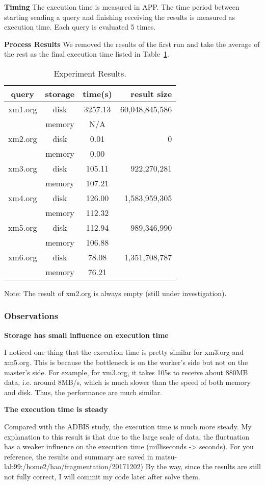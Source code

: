 \textbf{Timing} The execution time is measured in APP. The time period between
starting sending a query and finishing receiving the results is measured as
execution time. Each query is evaluated 5 times. 

\textbf{Process Results}
We removed the results of the  first run and take the average of the rest as
the final execution time listed in Table~\ref{table:E2017120401_1}. 


\begin{table}[t]
	\caption{Experiment Results.}
	\label{table:E2017120401_1}
	\centering
	\begin{tabular}{c|c|c|r}
 		\hline \hline
 query  & storage & time(s)  &   result size  \\
 \hline \hline
 xm1.org &  disk   & 3257.13  & 60,048,845,586 \\
         & memory  &    N/A   &  \\
 \hline
 xm2.org &  disk   &    0.01  &              0 \\
         & memory  &    0.00  &  \\
  \hline
 xm3.org &  disk   &  105.11  &    922,270,281 \\
         & memory  &  107.21  &  \\
  \hline
 xm4.org &  disk   &  126.00  &  1,583,959,305 \\
         & memory  &  112.32  &  \\
  \hline
 xm5.org &  disk   &  112.94  &    989,346,990 \\
         & memory  &  106.88  &   \\
  \hline
 xm6.org &  disk   &   78.08  &  1,351,708,787 \\
         & memory  &   76.21  &   \\
 \hline \hline
	\end{tabular}
\end{table}


Note: The result of xm2.org is always empty (still under investigation).


\subsubsection{Observations}
\textbf{Storage has small influence on execution time}

I noticed one thing that the execution time is pretty similar for
xm3.org and xm5.org. This is because the bottleneck is on the worker's
side but not on the master's side. For example, for xm3.org,
it takes 105s to receive about 880MB data, i.e. around 8MB/s, which
is much slower than the speed of both memory and disk. Thus,
the performance are much similar.

\textbf{The execution time is steady}

Compared with the ADBIS study, the execution time is much more
steady. My explanation to this result is that due to the large scale
of data, the fluctuation has a weaker influence on the execution
time (milliseconds -> seconds). For you reference, the results and
summary are saved in matsu-lab99:/home2/hao/fragmentation/20171202)
By the way, since the results are still not fully correct, I will
commit my code later after solve them.

 